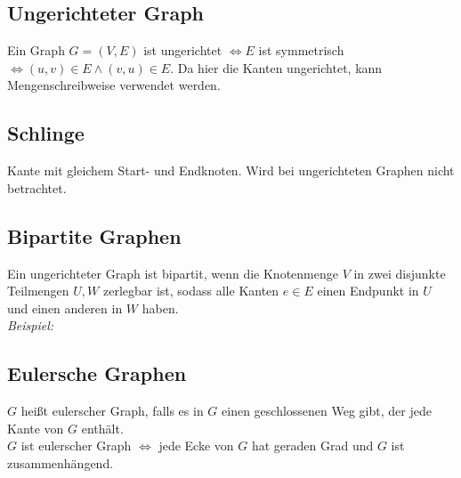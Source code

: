 \subsection*{Ungerichteter Graph}
Ein Graph $G=(V,E)$ ist ungerichtet $\Leftrightarrow E$ ist symmetrisch $\Leftrightarrow (u,v)\in E\wedge (v,u)\in E$. Da hier die Kanten ungerichtet, kann Mengenschreibweise verwendet werden.
\subsection*{Schlinge}
Kante mit gleichem Start- und Endknoten. Wird bei ungerichteten Graphen nicht betrachtet.
\subsection*{Bipartite Graphen}
Ein ungerichteter Graph ist bipartit, wenn die Knotenmenge $V$ in zwei disjunkte Teilmengen $U,W$ zerlegbar ist, sodass alle Kanten $e\in E$ einen Endpunkt in $U$ und einen anderen in $W$ haben.\\
\emph{Beispiel:}\\
\subsection*{Eulersche Graphen}
$G$ heißt eulerscher Graph, falls es in $G$ einen geschlossenen Weg gibt, der jede Kante von $G$ enthält.\\
$G$ ist eulerscher Graph $\Leftrightarrow$ jede Ecke von $G$ hat geraden Grad und $G$ ist zusammenhängend.
